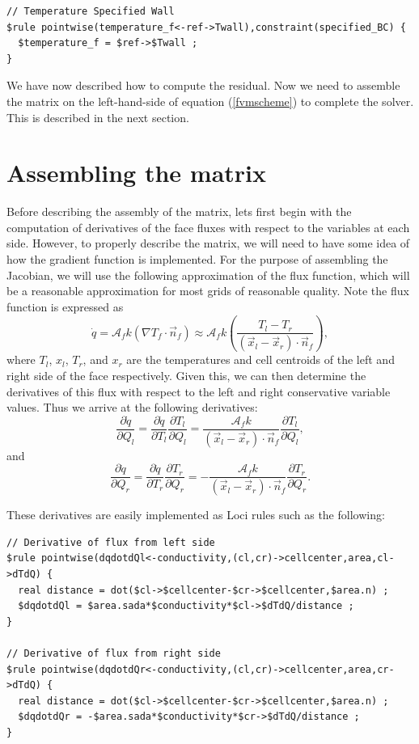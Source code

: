 \documentclass[10pt,epsf,letterpaper,twoside]{book}
\begin{document}
\begin{verbatim}
// Temperature Specified Wall
$rule pointwise(temperature_f<-ref->Twall),constraint(specified_BC) {
  $temperature_f = $ref->$Twall ;
}
\end{verbatim}

We have now described how to compute the residual.  Now we need to
assemble the matrix on the left-hand-side of equation
(\ref{fvmscheme}) to complete the solver.  This is described in the
next section.

\section{Assembling the matrix}

Before describing the assembly of the matrix, lets first begin with
the computation of derivatives of the face fluxes with respect to the
variables at each side.  However, to properly describe the matrix, we
will need to have some idea of how the gradient function is
implemented.  For the purpose of assembling the Jacobian, we will use
the following approximation of the flux function, which will be a
reasonable approximation for most grids of reasonable quality.  Note
the flux function is expressed as
\begin{equation}
\dot{q} = \mathcal{A}_f k \left( \nabla T_f \cdot \vec{n}_f\right) \approx \mathcal{A}_f k \left(\frac{T_l-T_r}{(\vec{x}_l-\vec{x}_r)\cdot \vec{n}_f}\right),
\end{equation}
where $T_l$, $x_l$, $T_r$, and $x_r$ are the temperatures and cell
centroids of the left and right side of the face respectively.  Given
this, we can then determine the derivatives of this flux with respect
to the left and right conservative variable values.  Thus we arrive at
the following derivatives:
\begin{equation}
\frac{\partial \dot{q}}{\partial Q_l} = \frac{\partial \dot{q}}{\partial T_l} \frac{\partial T_l}{\partial Q_l} = \frac{\mathcal{A}_f k }{(\vec{x}_l-\vec{x}_r)\cdot \vec{n}_f}\frac{\partial T_l}{\partial Q_l},
\end{equation}
and
\begin{equation}
\frac{\partial \dot{q}}{\partial Q_r} = \frac{\partial \dot{q}}{\partial T_r} \frac{\partial T_r}{\partial Q_r} = -\frac{\mathcal{A}_f k }{(\vec{x}_l-\vec{x}_r)\cdot \vec{n}_f}\frac{\partial T_r}{\partial Q_r}.
\end{equation}

These derivatives are easily implemented as Loci rules such as the following:
\begin{verbatim}
// Derivative of flux from left side
$rule pointwise(dqdotdQl<-conductivity,(cl,cr)->cellcenter,area,cl->dTdQ) {
  real distance = dot($cl->$cellcenter-$cr->$cellcenter,$area.n) ;
  $dqdotdQl = $area.sada*$conductivity*$cl->$dTdQ/distance ;
}

// Derivative of flux from right side
$rule pointwise(dqdotdQr<-conductivity,(cl,cr)->cellcenter,area,cr->dTdQ) {
  real distance = dot($cl->$cellcenter-$cr->$cellcenter,$area.n) ;
  $dqdotdQr = -$area.sada*$conductivity*$cr->$dTdQ/distance ;
}
\end{verbatim}
\end{document}
